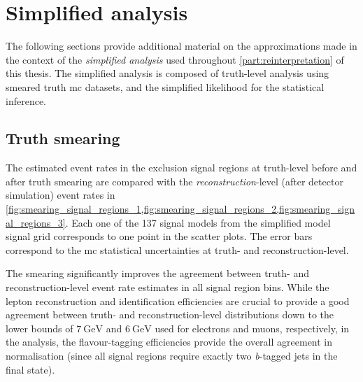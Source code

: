 
\chapter{Simplified analysis}


\graphicspath{{chapter-pmssm/Figs/Vector/}{chapter-pmssm/Figs/}}

The following sections provide additional material on the approximations made in the context of the \textit{simplified analysis} used throughout \cref{part:reinterpretation} of this thesis. The simplified analysis is composed of truth-level analysis using smeared truth \gls{mc} datasets, and the simplified likelihood for the statistical inference.

\section{Truth smearing}

The estimated event rates in the exclusion signal regions at truth-level before and after truth smearing are compared with the \textit{reconstruction}-level (\ie after detector simulation) event rates in \cref{fig:smearing_signal_regions_1,fig:smearing_signal_regions_2,fig:smearing_signal_regions_3}. Each one of the 137 signal models from the simplified model signal grid corresponds to one point in the scatter plots. The error bars correspond to the \gls{mc} statistical uncertainties at truth- and reconstruction-level.

The smearing significantly improves the agreement between truth- and reconstruction-level event rate estimates in all signal region bins. While the lepton reconstruction and identification efficiencies are crucial to provide a good agreement between truth- and reconstruction-level distributions down to the lower bounds of $\SI{7}{\GeV}$ and $\SI{6}{\GeV}$ used for electrons and muons, respectively, in the analysis, the flavour-tagging efficiencies provide the overall agreement in normalisation (since all signal regions require exactly two \textit{b}-tagged jets in the final state).

